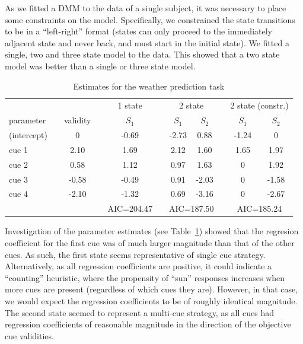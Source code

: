 \documentclass[a4paper,12pt,man]{apa} %
\begin{document}
As we fitted a DMM to the data of a single subject, it was necessary
to place some constraints on the model.  Specifically, we constrained
the state transitions to be in a ``left-right'' format (states can
only proceed to the immediately adjacent state and never back, and
must start in the initial state).  We fitted a single, two and three
state model to the data.  This showed that a two state model was
better than a single or three state model.

\begin{table}
\caption{Estimates for the weather prediction task}
\label{tab:WPT}
\begin{tabular}{lcccccccccc} \hline
 & & \multicolumn{1}{c}{} && \multicolumn{1}{c}{1 state} & & \multicolumn{2}{c}{2 state} &&
 \multicolumn{2}{c}{2 state (constr.)} \\ \cline{5-5} \cline{7-8} \cline{10-11}
parameter && validity && $S_1$ & & $S_1$ & $S_2$ & & $S_1$ & $S_2$ \\ \hline
(intercept) && 0 && -0.69 & & -2.73 & 0.88 & & -1.24 & 0 \\
cue 1 && 2.10 && 1.69 && 2.12 & 1.60 && 1.65 & 1.97 \\
cue 2 && 0.58 && 1.12 && 0.97 & 1.63 && 0 & 1.92 \\
cue 3 && -0.58 && -0.49 && 0.91 & -2.03 && 0 & -1.58 \\
cue 4 && -2.10 && -1.32 && 0.69 & -3.16 && 0 & -2.67 \\ \hline
 & & & & \multicolumn{1}{c}{AIC=204.47} & & \multicolumn{2}{c}{AIC=187.50} &&
 \multicolumn{2}{c}{AIC=185.24}
\end{tabular}
\end{table}

Investigation of the parameter estimates (see Table~\ref{tab:WPT})
showed that the regresion coefficient for the first cue was of much
larger magnitude than that of the other cues. As such, the first
state seems representative of single cue strategy.  Alternatively, as
all regression coefficients are positive, it could indicate a
``counting'' heuristic, where the propensity of ``sun'' responses
increases when more cues are present (regardless of which cues they
are).  However, in that case, we would expect the regression
coefficients to be of roughly identical magnitude. The second state
seemed to represent a multi-cue strategy, as all cues had regression
coefficients of reasonable magnitude in the direction of the objective
cue validities.
\end{document}
